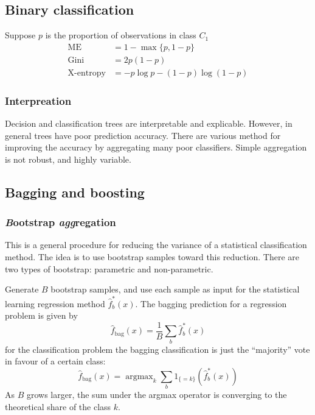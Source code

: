 \documentclass[a4paper]{article}
\newcommand{\argmax}{\mathop{\text{argmax}}}
\begin{document}

\subsection{Binary classification} %
\label{sub:binary_classification}

Suppose $p$ is the proportion of observations in class $C_1$
\begin{align*}
	\text{ME} &= 1 - \max\{p, 1-p\}\\
	\text{Gini} &= 2 p (1-p)\\
	\text{X-entropy} &= - p\log p - (1-p)\log (1-p)
\end{align*}


\subsubsection{Interpreation} %
\label{ssub:interpreation}

Decision and classification trees are interpretable and explicable. However, in
general trees have poor prediction accuracy. There are various method for improving
the accuracy by aggregating many poor classifiers. Simple aggregation is not robust,
and highly variable.




\subsection{Bagging and boosting} %
\label{sub:bagging_and_boosting}

\subsubsection{\emph{B}ootstrap \emph{agg}regation} %
\label{ssub:bootstrap_aggregation}

This is a general procedure for reducing the variance of a statistical classification
method. The idea is to use bootstrap samples toward this reduction. There are two types
of bootstrap: parametric and non-parametric.

Generate $B$ bootstrap samples, and use each sample as input for the statistical
learning regression method $\hat{f}^*_b(x)$. The bagging prediction for a regression
problem is given by
\[\hat{f}_\text{bag}(x) = \frac{1}{B} \sum_b \hat{f}^*_b(x)\]
for the classification problem the bagging classification is just the ``majority'' vote in
favour of a certain class:
\[\hat{f}_\text{bag}(x) = \argmax_k \sum_b 1_{\{=k\}}(\hat{f}^*_b(x))\]
As $B$ grows larger, the sum under the argmax operator is converging to the
theoretical share of the class $k$.
\end{document}
